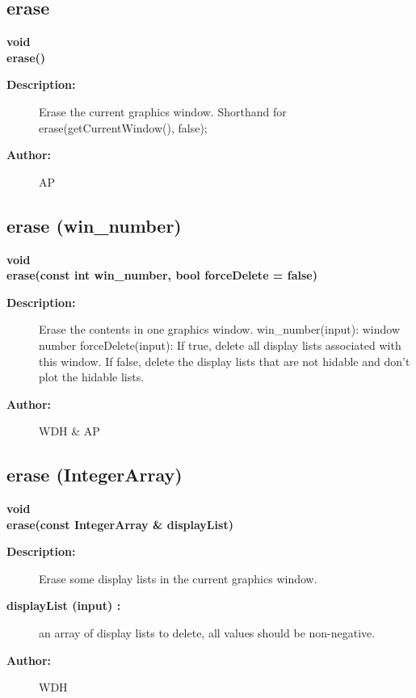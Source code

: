 \subsection{erase}
 
\begin{flushleft} \textbf{%
void  \\ 
\settowidth{\GLGraphicsInterfaceIncludeArgIndent}{erase(}%
erase()
}\end{flushleft}
\begin{description}
\item[{\bf Description:}] 
    Erase the current graphics window. Shorthand for erase(getCurrentWindow(), false);

\item[{\bf Author:}]  AP
\end{description}
\subsection{erase (win\_number)}
 
\begin{flushleft} \textbf{%
void  \\ 
\settowidth{\GLGraphicsInterfaceIncludeArgIndent}{erase(}%
erase(const int win\_number, bool forceDelete  = false)
}\end{flushleft}
\begin{description}
\item[{\bf Description:}] 
    Erase the contents in one graphics window.
 win\_number(input): window number
 forceDelete(input): If true, delete all display lists associated with this window. If false,
 delete the display lists that are not hidable and don't plot the hidable lists.

\item[{\bf Author:}]  WDH \& AP
\end{description}
\subsection{erase (IntegerArray)}
 
\begin{flushleft} \textbf{%
void  \\ 
\settowidth{\GLGraphicsInterfaceIncludeArgIndent}{erase(}%
erase(const IntegerArray \& displayList)
}\end{flushleft}
\begin{description}
\item[{\bf Description:}] 
    Erase some display lists in the current graphics window.

\item[{\bf displayList (input) :}]  an array of display lists to delete, all values should be non-negative.
\item[{\bf Author:}]  WDH
\end{description}
